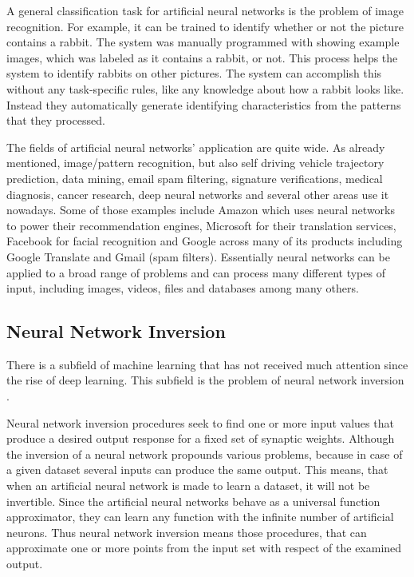 A general classification task for artificial neural networks is the problem of image recognition. For example, it can be trained to identify whether or not the picture contains a rabbit. The system was manually programmed with showing example images, which was labeled as it contains a rabbit, or not. This process helps the system to identify rabbits on other pictures. The system can accomplish this without any task-specific rules, like any knowledge about how a rabbit looks like. Instead they automatically generate identifying characteristics from the patterns that they processed.\medskip

The fields of artificial neural networks' application are quite wide. As already mentioned, image/pattern recognition, but also self driving vehicle trajectory prediction, data mining, email spam filtering, signature verifications, medical diagnosis, cancer research, deep neural networks and several other areas use it nowadays. Some of those examples include Amazon which uses neural networks to power their recommendation engines, Microsoft for their translation services, Facebook for facial recognition and Google across many of its products including Google Translate and Gmail (spam filters). Essentially neural networks can be applied to a broad range of problems and can process many different types of input, including images, videos, files and databases among many others. 



\subsection{Neural Network Inversion}

There is a subfield of machine learning that has not received much attention since the rise of deep learning. This subfield is the problem of neural network inversion \cite{KINDERMANN1990277}. \smallskip

\label{para:inversion}Neural network inversion procedures seek to find one or more input values that produce a desired output response for a fixed set of synaptic weights. Although the inversion of a neural network propounds various problems, because in case of a given dataset several inputs can produce the same output. This means, that when an artificial neural network is made to learn a dataset, it will not be invertible. Since the artificial neural networks behave as a universal function approximator, they can learn any function with the infinite number of artificial neurons. Thus neural network inversion means those procedures, that can approximate one or more points from the input set with respect of the examined output. \medskip

